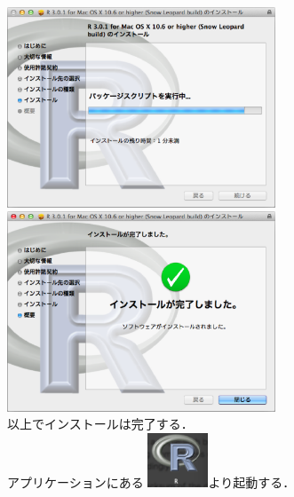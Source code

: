 \includegraphics[width=8cm]{img/osx/osx010.eps}\hspace{0.8em} \includegraphics[width=8cm]{img/osx/osx011.eps}\\

以上でインストールは完了する．\\

アプリケーションにある \includegraphics[width=1.8cm]{img/osx/osx012.eps}より起動する．
